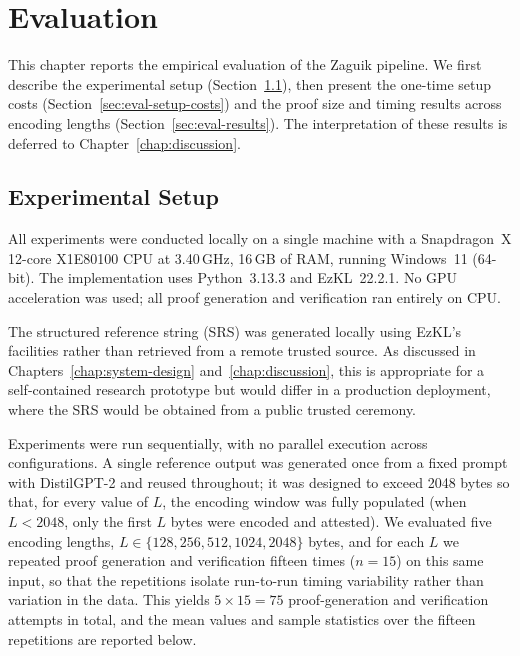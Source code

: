 \chapter{Evaluation}
\label{chap:evaluation}

This chapter reports the empirical evaluation of the Zaguik pipeline. We first describe the experimental setup (Section~\ref{sec:eval-setup}), then present the one-time setup costs (Section~\ref{sec:eval-setup-costs}) and the proof size and timing results across encoding lengths (Section~\ref{sec:eval-results}). The interpretation of these results is deferred to Chapter~\ref{chap:discussion}.

\section{Experimental Setup}
\label{sec:eval-setup}

All experiments were conducted locally on a single machine with a Snapdragon~X 12-core X1E80100 CPU at 3.40\,GHz, 16\,GB of RAM, running Windows~11 (64-bit). The implementation uses Python~3.13.3 and EzKL~22.2.1. No GPU acceleration was used; all proof generation and verification ran entirely on CPU.

\medskip

The structured reference string (SRS) was generated locally using EzKL's facilities rather than retrieved from a remote trusted source. As discussed in Chapters~\ref{chap:system-design} and~\ref{chap:discussion}, this is appropriate for a self-contained research prototype but would differ in a production deployment, where the SRS would be obtained from a public trusted ceremony.

\medskip

Experiments were run sequentially, with no parallel execution across configurations. A single reference output was generated once from a fixed prompt with DistilGPT-2 and reused throughout; it was designed to exceed 2048 bytes so that, for every value of $L$, the encoding window was fully populated (when $L < 2048$, only the first $L$ bytes were encoded and attested). We evaluated five encoding lengths, $L \in \{128, 256, 512, 1024, 2048\}$ bytes, and for each $L$ we repeated proof generation and verification fifteen times ($n = 15$) on this same input, so that the repetitions isolate run-to-run timing variability rather than variation in the data. This yields $5 \times 15 = 75$ proof-generation and verification attempts in total, and the mean values and sample statistics over the fifteen repetitions are reported below.

